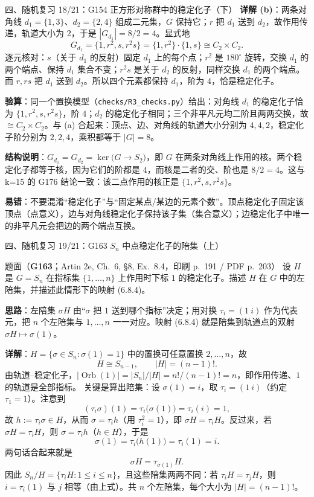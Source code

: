 \documentclass[aspectratio=169,10pt,fontset=none]{ctexbeamer}
\newcommand{\ex}[1]{\textcolor{accent}{\footnotesize\bfseries #1}}
\newcommand{\key}[1]{\textcolor{ink}{\bfseries #1}}
\begin{document}
\begin{frame}[t]{四、随机复习 18/21：G154 正方形对称群中的稳定化子（下）}
\scriptsize
\key{详解 (b)}：两条对角线 $d_1=\{1,3\}$、$d_2=\{2,4\}$ 组成二元集，$G$ 保持它；$r$ 把 $d_1$ 送到 $d_2$，故作用传递，轨道大小为 $2$，于是 $|G_{d_1}|=8/2=4$。显式地
\[ G_{d_1}=\{1,r^2,s,r^2s\}=\{1,r^2\}\cdot\{1,s\}\cong C_2\times C_2. \]
逐元核对：$s$（关于 $d_1$ 的反射）固定 $d_1$ 上的每个点；$r^2$ 是 $180^\circ$ 旋转，交换 $d_1$ 的两个端点、保持 $d_1$ 集合不变；$r^2s$ 是关于 $d_2$ 的反射，同样交换 $d_1$ 的两个端点。而 $r,rs$ 把 $d_1$ 送到 $d_2$。所以四个元素都保持 $d_1$，阶为 $4$，恰是稳定化子。

\key{验算}：同一个置换模型（\texttt{checks/R3\_checks.py}）给出：对角线 $d_1$ 的稳定化子恰为 $\{1,r^2,s,r^2s\}$，阶 $4$；$d_2$ 的稳定化子相同；三个非平凡元均二阶且两两交换，故 $\cong C_2\times C_2$。与 (a) 合起来：顶点、边、对角线的轨道大小分别为 $4,4,2$，稳定化子阶分别为 $2,2,4$，乘积都等于 $|G|=8$。

\key{结构说明}：$G_{d_1}=G_{d_2}=\ker\bigl(G\to S_2\bigr)$，即 $G$ 在两条对角线上作用的核。两个稳定化子都等于核，因为它们的阶都是 $4$，而核是二者的交、阶也是 $8/2=4$。这与 k=15 的 G176 结论一致：该二点作用的核正是 $\{1,r^2,s,r^2s\}$。

\key{易错}：不要混淆“稳定化子”与“固定某点/某边的元素个数”。顶点稳定化子固定该顶点（点意义），边与对角线稳定化子保持该子集（集合意义）；边稳定化子中唯一的非平凡元会把边的两个端点互换。
\end{frame}

\begin{frame}[t]{四、随机复习 19/21：G163 $S_n$ 中点稳定化子的陪集（上）}
\label{ex:G163}
\scriptsize
\begin{block}{\footnotesize 题面（\ex{G163}；Artin 2e, Ch.~6, \S8, Ex.~8.4，印刷 p.~191 / PDF p.~203）}
设 $H$ 是 $G=S_n$ 在指标集 $\{1,\dots,n\}$ 上作用时下标 $1$ 的稳定化子。描述 $H$ 在 $G$ 中的左陪集，并描述此情形下的映射 (6.8.4)。
\end{block}
\key{思路}：左陪集 $\sigma H$ 由“$\sigma$ 把 $1$ 送到哪个指标”决定；用对换 $\tau_i=(1\ i)$ 作为代表元，把 $n$ 个左陪集与 $1,\dots,n$ 一一对应。映射 (6.8.4) 就是陪集到轨道点的双射 $\sigma H\mapsto\sigma(1)$。

\key{详解}：$H=\{\sigma\in S_n:\sigma(1)=1\}$ 中的置换可任意置换 $2,\dots,n$，故
\[ H\cong S_{n-1},\qquad |H|=(n-1)!. \]
由轨道--稳定化子，$|\operatorname{Orb}(1)|=|S_n|/|H|=n!/(n-1)!=n$，即作用传递、$1$ 的轨道是全部指标。
关键是算出陪集：设 $\sigma(1)=i$，取 $\tau_i=(1\ i)$（约定 $\tau_1=1$）。注意到
\[ (\tau_i\sigma)(1)=\tau_i\bigl(\sigma(1)\bigr)=\tau_i(i)=1, \]
故 $h:=\tau_i\sigma\in H$，从而 $\sigma=\tau_i h$（用 $\tau_i^2=1$），即 $\sigma H=\tau_i H$。反过来，若 $\sigma H=\tau_i H$，则 $\sigma=\tau_i h$（$h\in H$），于是
\[ \sigma(1)=\tau_i\bigl(h(1)\bigr)=\tau_i(1)=i. \]
两句话合起来就是
\[ \sigma H=\tau_{\sigma(1)}H. \]
因此 $S_n/H=\{\tau_iH:1\le i\le n\}$，且这些陪集两两不同：若 $\tau_iH=\tau_jH$，则 $i=\tau_i(1)$ 与 $j$ 相等（由上式）。共 $n$ 个左陪集，每个大小为 $|H|=(n-1)!$。
\end{frame}
\end{document}
